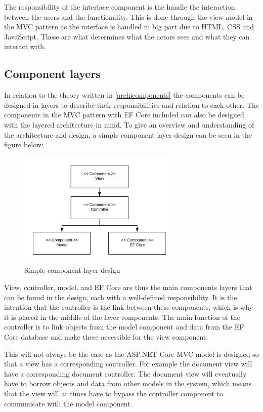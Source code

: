 \documentclass[../../master.tex]{subfiles}
\begin{document}
The responsibility of the interface component is the handle the interaction between the users and the functionality.
This is done through the view model in the MVC pattern as the interface is handled in big part due to HTML, CSS and JavaScript.
These are what determines what the actors sees and what they can interact with.

\subsection{Component layers}
In relation to the theory written in \cref{archicomponents} the components can be designed in layers to describe their responsibilities and relation to each other.
The components in the MVC pattern with EF Core included can also be designed with the layered architecture in mind.
To give an overview and understanding of the architecture and design, a simple component layer design can be seen in the figure below:

\begin{figure}[H]
	\centering
	\includegraphics[width=0.7\textwidth]{billeder/simplecomponents.jpeg}
	\caption{Simple component layer design}\label{fig:SimpleComponent}
\end{figure}

View, controller, model, and EF Core are thus the main components layers that can be found in the design, each with a well-defined responsibility.
It is the intention that the controller is the link between these components, which is why it is placed in the middle of the layer components.
The main function of the controller is to link objects from the model component and data from the EF Core database and make these accessible for the view component.

This will not always be the case as the ASP.NET Core MVC model is designed so that a view has a corresponding controller.
For example the document view will have a corresponding document controller.
The document view will eventually have to borrow objects and data from other models in the system, which means that the view will at times have to bypass the controller component to communicate with the model component.
\end{document}
